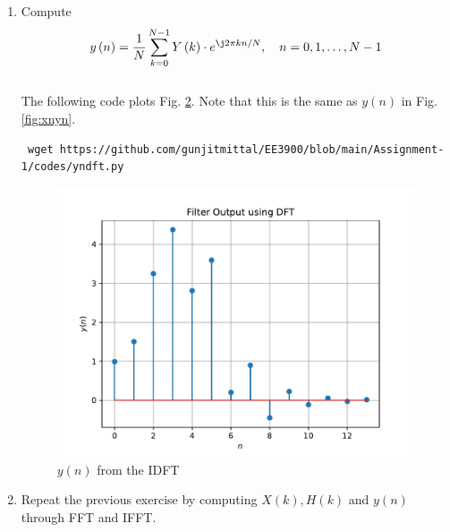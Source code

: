 \documentclass[journal,12pt,twocolumn]{IEEEtran}
\renewcommand\thesection{\arabic{section}}
\begin{document}
\begin{enumerate}[label=\thesection.\arabic*]
\begin{figure}[!ht]
  \caption{$Y(n)$}
  \label{fig:Y(n)}
  \end{figure}
  The following code plots Fig. \ref{fig:Y(n)}.
%
\begin{lstlisting}
wget https://github.com/gunjitmittal/EE3900/blob/main/Assignment-1/codes/6_2.py
\end{lstlisting}
\item Compute
\begin{equation}
  y\brak{n}={\frac {1}{N}}\sum _{k=0}^{N-1}Y\brak{k}\cdot e^{\j 2\pi kn/N},\quad n = 0,1,\dots, N-1
  \label{eq:inv-ft}
 \end{equation}
 \\
 \solution The following code plots Fig. \ref{fig:yndft}. Note that this is the same as 
 $y(n)$ in  Fig. 
 \ref{fig:xnyn}. 
 \begin{lstlisting}
 wget https://github.com/gunjitmittal/EE3900/blob/main/Assignment-1/codes/yndft.py
 \end{lstlisting}
 \begin{figure}[!ht]
 \centering
 \includegraphics[width=\columnwidth]{./figs/yndft}
 \caption{$y(n)$ from the IDFT}
 \label{fig:yndft}
 \end{figure}
 \item Repeat the previous exercise by computing $X(k), H(k)$ and $y(n)$ through FFT and 
 IFFT.\\
 \solution
 \begin{figure}[!ht]
  \centering

\end{figure}
\end{enumerate}
\end{document}
